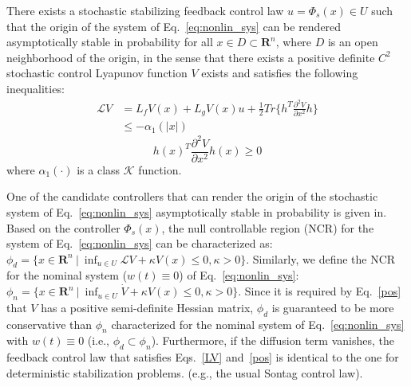 \documentclass[letterpaper, 10pt, conference]{ieeeconf}
\begin{document}
	\begin{asm}
		There exists a stochastic stabilizing feedback control law $u=\Phi_s(x) \in U$ such that the origin of the system of Eq.~\ref{eq:nonlin_sys} can be rendered asymptotically stable in probability for all $x \in D \subset \mathbf{R}^n$, where $D$ is an open neighborhood of the origin, in the sense that there exists a positive definite $C^2$ stochastic control Lyapunov function $V$ exists and satisfies the following inequalities:
		\begin{equation}\label{LV}
		\begin{split}
		\mathcal{L}V&=L_fV(x)+L_gV(x)u+\frac{1}{2} Tr\{h^T\frac{\partial^2 V}{\partial x^2}h\}\\
		&\leq - \alpha_1(\vert x \vert)
		\end{split}
		\end{equation}
		\begin{equation}\label{pos}
		h(x)^T\frac{\partial^2 V}{\partial x^2}h(x) \geq 0
		\end{equation}
		where $\alpha_1(\cdot)$ is a class $\mathcal{K}$ function. 
		
		One of the candidate controllers that can render the origin of the stochastic system of Eq.~\ref{eq:nonlin_sys} asymptotically stable in probability is given in\cite{deng2001stabilization}. Based on the controller $\Phi_s(x)$, the null controllable region (NCR) for the system of Eq.~\ref{eq:nonlin_sys} can be characterized as: $\phi_d=\{ x \in \mathbf{R}^n ~|~ \inf_{ u \in U } \mathcal{L}V + \kappa V(x) \leq 0, \kappa > 0\}$. Similarly, we define the NCR for the nominal system ($w(t) \equiv 0$) of Eq.~\ref{eq:nonlin_sys}: $\phi_n=\{ x \in \mathbf{R}^n~|~ \inf_{ u \in U } \dot{V} + \kappa V(x) \leq 0, \kappa > 0\} $. Since it is required by Eq.~\ref{pos} that $V$ has a positive semi-definite Hessian matrix, $\phi_d$ is guaranteed to be more conservative than $\phi_n$ characterized for the nominal system of Eq.~\ref{eq:nonlin_sys} with $w(t) \equiv 0$ (i.e., $\phi_d \subset \phi_n$). Furthermore, if the diffusion term vanishes, the feedback control law that satisfies Eqs.~\ref{LV} and~\ref{pos} is identical to the one for deterministic stabilization problems. (e.g., the usual Sontag control law\cite{lin1991universal}). %
	\end{asm}
	
\end{document}
